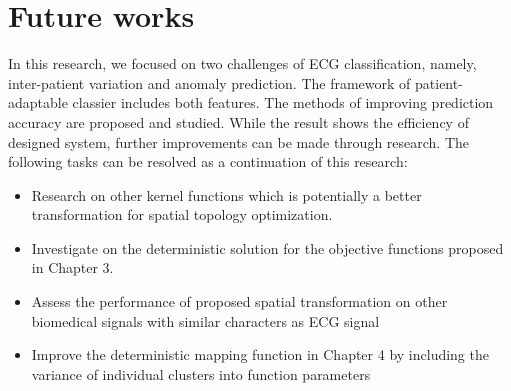 \section{Future works}
In this research, we focused on two challenges of ECG classification, namely, inter-patient variation and anomaly prediction. The framework of patient-adaptable classier includes both features. The methods of improving prediction accuracy are proposed and studied. While the result shows the efficiency of designed system, further improvements can be made through research. The following tasks can be resolved as a continuation of this research:
 \begin{itemize}
\item Research on other kernel functions which is potentially a better transformation for spatial topology optimization.
\item Investigate on the deterministic solution for the objective functions proposed in Chapter 3.
\item Assess the performance of proposed spatial transformation on other biomedical signals with similar characters as ECG signal
\item  Improve the deterministic mapping function in Chapter 4 by including the variance of individual clusters into function parameters
\end{itemize}

